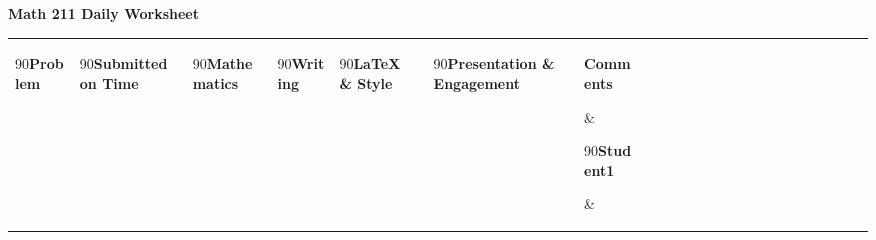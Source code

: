 \documentclass[landscape]{article}
\begin{document}
\thispagestyle{empty}

\begin{center}
    \Large\textbf{Math 211 Daily Worksheet}
\end{center}

\vspace{0.5cm}

\setlength{\tabcolsep}{4pt}
\renewcommand{\arraystretch}{1.5}

\noindent
\begin{tabular}{|
>{\centering\arraybackslash}m{1.5 cm}|
>{\centering\arraybackslash}m{0.35cm}|
>{\centering\arraybackslash}m{0.35cm}|
>{\centering\arraybackslash}m{0.35cm}|
>{\centering\arraybackslash}m{0.35cm}|
>{\centering\arraybackslash}m{0.35cm}|
>{\arraybackslash}m{9.5cm}|
>{\centering\arraybackslash}m{0.35cm}|%
>{\centering\arraybackslash}m{0.35cm}|%
>{\centering\arraybackslash}m{0.35cm}|%
>{\centering\arraybackslash}m{0.35cm}|%
>{\centering\arraybackslash}m{0.35cm}|%
>{\centering\arraybackslash}m{0.35cm}|%
>{\centering\arraybackslash}m{0.35cm}|%
>{\centering\arraybackslash}m{0.35cm}|%
>{\centering\arraybackslash}m{0.35cm}|%
>{\centering\arraybackslash}m{0.35cm}|%
>{\centering\arraybackslash}m{0.35cm}|%
>{\centering\arraybackslash}m{0.35cm}|%
>{\centering\arraybackslash}m{0.35cm}|%
>{\centering\arraybackslash}m{0.35cm}|%
>{\centering\arraybackslash}m{0.35cm}|%
>{\centering\arraybackslash}m{0.35cm}|%
}
\hline
\multicolumn{7}{|c|}{\textbf{Presenters}} & \multicolumn{16}{c|}{\textbf{Contributors}} \\
\hline
\begin{turn}{90}\textbf{Problem}\end{turn} &
\begin{turn}{90}\textbf{Submitted on Time}\end{turn} &
\begin{turn}{90}\textbf{Mathematics}\end{turn} &
\begin{turn}{90}\textbf{Writing}\end{turn} &
\begin{turn}{90}\textbf{\LaTeX\ \& Style}\end{turn} &
\begin{turn}{90}\textbf{Presentation \& Engagement}\end{turn} &
\parbox[c][1.5cm][c]{8cm}{\centering\textbf{Comments}} &
\begin{turn}{90}\textbf{Student1}\end{turn} &

\end{tabular}
\end{document}
